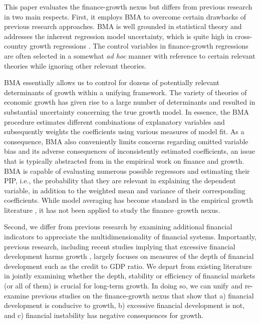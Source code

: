 \begin{refsection}
This paper evaluates the finance-growth nexus but differs from previous research in two main respects. First, it employs \ac{BMA} to overcome certain drawbacks of previous research approaches. \ac{BMA} is well grounded in statistical theory \parencite{Rafteryetal1997} and addresses the inherent regression model uncertainty, which is quite high in cross-country growth regressions \parencite{Fernandezetal2001, SalaiMartinetal2004, Durlaufetal2008}. The control variables in finance-growth regressions are often selected in a somewhat \textit{ad hoc} manner with reference to certain relevant theories while ignoring other relevant theories. 

\ac{BMA} essentially allows us to control for dozens of potentially relevant determinants of growth within a unifying framework. The variety of theories of economic growth has given rise to a large number of determinants and resulted in substantial uncertainty concerning the true growth model. In essence, the \ac{BMA} procedure estimates different combinations of explanatory variables and subsequently weights the coefficients using various measures of model fit. As a consequence, \ac{BMA} also conveniently limits concerns regarding omitted variable bias and its adverse consequences of inconsistently estimated coefficients, an issue that is typically abstracted from in the empirical work on finance and growth. \ac{BMA} is capable of evaluating numerous possible regressors and estimating their \ac{PIP}, i.e., the probability that they are relevant in explaining the dependent variable, in addition to the weighted mean and variance of their corresponding coefficients. While model averaging has become standard in the empirical growth literature \parencite{SalaiMartinetal2004, Durlaufetal2008}, it has not been applied to study the finance--growth nexus.  

Second, we differ from previous research by examining additional financial indicators to appreciate the multidimensionality of financial systems. Importantly, previous research, including recent studies implying that excessive financial development harms growth \parencite{Arcandetal2012,CecchettiKharroubi2012,LawSingh2014}, largely focuses on measures of the depth of financial development such as the credit to GDP ratio. We depart from existing literature in jointly examining whether the depth, stability or efficiency of financial markets (or all of them) is crucial for long-term growth. In doing so, we can unify and re-examine previous studies on the finance-growth nexus that show that a) financial development is conducive to growth, b) excessive financial development is not, and c) financial instability has negative consequences for growth.


\end{refsection}
